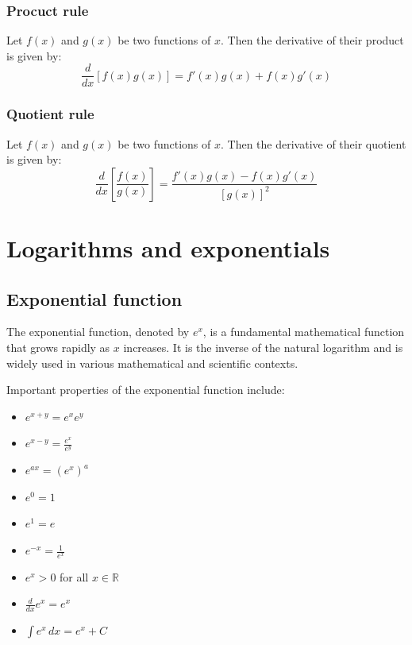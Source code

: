 \documentclass[11pt]{book} %
\begin{document}
\subsubsection{Procuct rule}
Let $f(x)$ and $g(x)$ be two functions of $x$. 
Then the derivative of their product is given by:
\begin{equation}
    \frac{d}{dx} [f(x)g(x)] = f'(x)g(x) + f(x)g'(x)
\end{equation}

\subsubsection{Quotient rule}
Let $f(x)$ and $g(x)$ be two functions of $x$. 
Then the derivative of their quotient is given by:
\begin{equation}
    \frac{d}{dx} \left[\frac{f(x)}{g(x)}\right] = \frac{f'(x)g(x) - f(x)g'(x)}{[g(x)]^2}
\end{equation}


\section{Logarithms and exponentials}


\subsection{Exponential function}
The exponential function, denoted by \(e^x\), is a fundamental mathematical function that grows rapidly as \(x\) increases. 
It is the inverse of the natural logarithm and is widely used in various mathematical and scientific contexts.

Important properties of the exponential function include:
\begin{itemize}
    \item \(e^{x+y} = e^x e^y\)
    \item \(e^{x-y} = \frac{e^x}{e^y}\)
    \item \(e^{ax} = (e^x)^a\)
    \item \(e^0 = 1\)
    \item \(e^1 = e\)
    \item \(e^{-x} = \frac{1}{e^x}\)
    \item \(e^{x} > 0\) for all \(x \in \mathbb{R}\)
    \item $\frac{d}{dx} e^x = e^x$
    \item $\int e^x \, dx = e^x + C$
\end{itemize}
\end{document}

